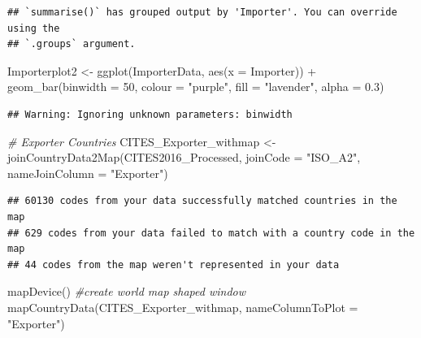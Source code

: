 \documentclass[
  12pt,
]{article}
\newenvironment{Shaded}{\begin{snugshade}}{\end{snugshade}}
\newcommand{\AttributeTok}[1]{\textcolor[rgb]{0.77,0.63,0.00}{#1}}
\newcommand{\CommentTok}[1]{\textcolor[rgb]{0.56,0.35,0.01}{\textit{#1}}}
\newcommand{\DecValTok}[1]{\textcolor[rgb]{0.00,0.00,0.81}{#1}}
\newcommand{\FloatTok}[1]{\textcolor[rgb]{0.00,0.00,0.81}{#1}}
\newcommand{\FunctionTok}[1]{\textcolor[rgb]{0.00,0.00,0.00}{#1}}
\newcommand{\NormalTok}[1]{#1}
\newcommand{\OtherTok}[1]{\textcolor[rgb]{0.56,0.35,0.01}{#1}}
\newcommand{\SpecialCharTok}[1]{\textcolor[rgb]{0.00,0.00,0.00}{#1}}
\newcommand{\StringTok}[1]{\textcolor[rgb]{0.31,0.60,0.02}{#1}}
\begin{document}
\begin{verbatim}
## `summarise()` has grouped output by 'Importer'. You can override using the
## `.groups` argument.
\end{verbatim}

\begin{Shaded}
\begin{Highlighting}[]
\NormalTok{Importerplot2 }\OtherTok{\textless{}{-}} \FunctionTok{ggplot}\NormalTok{(ImporterData, }\FunctionTok{aes}\NormalTok{(}\AttributeTok{x =}\NormalTok{ Importer)) }\SpecialCharTok{+} \FunctionTok{geom\_bar}\NormalTok{(}\AttributeTok{binwidth =} \DecValTok{50}\NormalTok{,}
    \AttributeTok{colour =} \StringTok{"purple"}\NormalTok{, }\AttributeTok{fill =} \StringTok{"lavender"}\NormalTok{, }\AttributeTok{alpha =} \FloatTok{0.3}\NormalTok{)}
\end{Highlighting}
\end{Shaded}

\begin{verbatim}
## Warning: Ignoring unknown parameters: binwidth
\end{verbatim}

\begin{Shaded}
\begin{Highlighting}[]
\CommentTok{\# Exporter Countries}
\NormalTok{CITES\_Exporter\_withmap }\OtherTok{\textless{}{-}} \FunctionTok{joinCountryData2Map}\NormalTok{(CITES2016\_Processed, }\AttributeTok{joinCode =} \StringTok{"ISO\_A2"}\NormalTok{,}
    \AttributeTok{nameJoinColumn =} \StringTok{"Exporter"}\NormalTok{)}
\end{Highlighting}
\end{Shaded}

\begin{verbatim}
## 60130 codes from your data successfully matched countries in the map
## 629 codes from your data failed to match with a country code in the map
## 44 codes from the map weren't represented in your data
\end{verbatim}

\begin{Shaded}
\begin{Highlighting}[]
\FunctionTok{mapDevice}\NormalTok{()  }\CommentTok{\#create world map shaped window}
\FunctionTok{mapCountryData}\NormalTok{(CITES\_Exporter\_withmap, }\AttributeTok{nameColumnToPlot =} \StringTok{"Exporter"}\NormalTok{)}
\end{Highlighting}
\end{Shaded}
\end{document}
